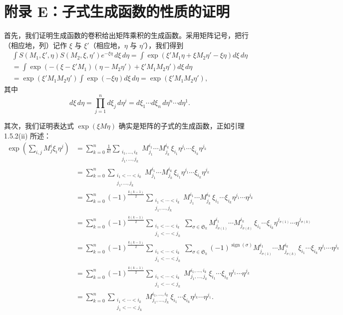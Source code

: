 \section{附录 E：子式生成函数的性质的证明}

首先，我们证明生成函数的卷积给出矩阵乘积的生成函数。采用矩阵记号，把行（相应地，列）记作 $\xi$ 与 $\xi'$（相应地，$\eta$ 与 $\eta'$），我们得到
\begin{gather*}
\int S(M_1,\xi',\eta)S(M_2,\xi,\eta')e^{-\xi\eta}\,d\xi\,d\eta
=\int \exp\left(\xi'M_1\eta+\xi M_2\eta'-\xi\eta\right)d\xi\,d\eta\\
=\int \exp\left(-(\xi-\xi'M_1)(\eta-M_2\eta')+\xi'M_1M_2\eta'\right)d\xi\,d\eta\\
=\exp\left(\xi'M_1M_2\eta'\right)\int \exp\left(-\xi\eta\right)d\xi\,d\eta
=\exp\left(\xi'M_1M_2\eta'\right),
\end{gather*}
其中
\[
d\xi\,d\eta=\prod_{j=1}^n d\xi_j\,d\eta^j=d\xi_1\cdots d\xi_n\,d\eta^n\cdots d\eta^1.
\]

其次，我们证明表达式 $\exp\left(\xi M\eta\right)$ 确实是矩阵的子式的生成函数，正如引理 1.5.2(ii) 所述：
\begin{align*}
\exp\left(\sum_{i,j} M_j^i\xi_i\eta^j\right)
&=\sum_{k=0}^n\frac1{k!}\sum_{\substack{i_1,\dots,i_k\\ j_1,\dots,j_k}}M_{j_1}^{i_1}\cdots M_{j_k}^{i_k}\,\xi_{i_1}\eta^{j_1}\cdots\xi_{i_k}\eta^{j_k}\\
&=\sum_{k=0}^n\sum_{\substack{i_1<\cdots<i_k\\ j_1,\dots,j_k}}M_{j_1}^{i_1}\cdots M_{j_k}^{i_k}\,\xi_{i_1}\eta^{j_1}\cdots\xi_{i_k}\eta^{j_k}\\
&=\sum_{k=0}^n(-1)^{\frac{k(k-1)}2}\sum_{\substack{i_1<\cdots<i_k\\ j_1,\dots,j_k}}M_{j_1}^{i_1}\cdots M_{j_k}^{i_k}\,\xi_{i_1}\cdots\xi_{i_k}\eta^{j_1}\cdots\eta^{j_k}\\
&=\sum_{k=0}^n(-1)^{\frac{k(k-1)}2}\sum_{\substack{i_1<\cdots<i_k\\ j_1<\cdots<j_k}}\sum_{\sigma\in\mathfrak{S}_k}M_{j_{\sigma(1)}}^{i_1}\cdots M_{j_{\sigma(k)}}^{i_k}\,\xi_{i_1}\cdots\xi_{i_k}\eta^{j_{\sigma(1)}}\cdots\eta^{j_{\sigma(k)}}\\
&=\sum_{k=0}^n(-1)^{\frac{k(k-1)}2}\sum_{\substack{i_1<\cdots<i_k\\ j_1<\cdots<j_k}}\sum_{\sigma\in\mathfrak{S}_k}(-1)^{\operatorname{sign}(\sigma)}M_{j_{\sigma(1)}}^{i_1}\cdots M_{j_{\sigma(k)}}^{i_k}\,\xi_{i_1}\cdots\xi_{i_k}\eta^{j_1}\cdots\eta^{j_k}\\
&=\sum_{k=0}^n(-1)^{\frac{k(k-1)}2}\sum_{\substack{i_1<\cdots<i_k\\ j_1<\cdots<j_k}}M_{j_1,\dots,j_k}^{i_1,\dots,i_k}\,\xi_{i_1}\cdots\xi_{i_k}\eta^{j_1}\cdots\eta^{j_k}\\
&=\sum_{k=0}^n\sum_{\substack{i_1<\cdots<i_k\\ j_1<\cdots<j_k}}M_{j_1,\dots,j_k}^{i_1,\dots,i_k}\,\xi_{i_1}\cdots\xi_{i_k}\eta^{j_k}\cdots\eta^{j_1}.
\end{align*}

